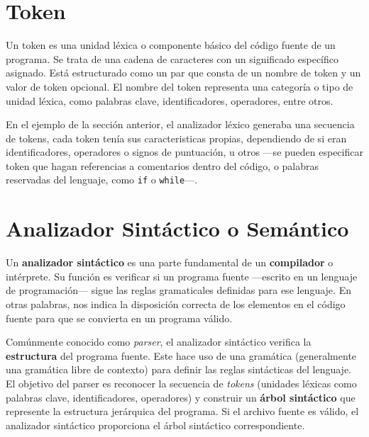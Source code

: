 \lstset{inputencoding=utf8/latin1}





\section{Token}
Un token es una unidad léxica o componente básico del código fuente de un programa. Se trata de una cadena de caracteres con un significado específico asignado. Está estructurado como un par que consta de un nombre de token y un valor de token opcional. El nombre del token representa una categoría o tipo de unidad léxica, como palabras clave, identificadores, operadores, entre otros\cite{token}.

En el ejemplo de la sección anterior, el analizador léxico generaba una secuencia de tokens, cada token tenía sus caracteristicas propias, dependiendo de si eran identificadores, operadores o signos de puntuación, u otros ---se pueden especificar token que hagan referencias a comentarios dentro del código, o palabras reservadas del lenguaje, como \lstinline[keywordstyle=\color{black}]|if| o \lstinline[keywordstyle=\color{black}]|while|---.

 
\section{Analizador Sintáctico o Semántico}
Un \textbf{analizador sintáctico} es una parte fundamental de un \textbf{compilador} o intérprete. Su función es verificar si un programa fuente ---escrito en un lenguaje de programación--- sigue las reglas gramaticales definidas para ese lenguaje\cite{analizadorsintactico}. En otras palabras, nos indica la disposición correcta de los elementos en el código fuente para que se convierta en un programa válido.

Comúnmente conocido como \textit{parser}, el analizador sintáctico verifica la \textbf{estructura} del programa fuente. Este hace uso de una gramática (generalmente una gramática libre de contexto) para definir las reglas sintácticas del lenguaje. El objetivo del parser es reconocer la secuencia de \textit{tokens} (unidades léxicas como palabras clave, identificadores, operadores) y construir un \textbf{árbol sintáctico} que represente la estructura jerárquica del programa. Si el archivo fuente es válido, el analizador sintáctico proporciona el árbol sintáctico correspondiente.


